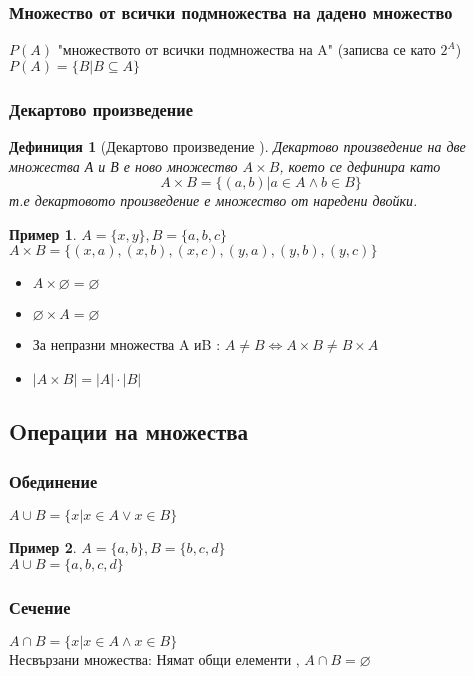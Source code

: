 \documentclass[fleqn, 12pt]{article}
\newtheorem{definition}{Дефиниция}[subsection]
\theoremstyle{definition}
\newtheorem{example}{Пример}[subsection]
\begin{document}
\subsubsection{Множество от всички подмножества на дадено множество}
$P(A)$ "множеството от всички подмножества на A" (записва се като $2^A$)\\
$P(A) = \{B | B\subseteq A \}$

\subsubsection{Декартово произведение}
\begin{definition}[Декартово произведение ]
Декартово произведение на две множества А и В е ново множество $A \times B$, което се дефинира като
$$A \times B = \{(a,b) | a\in A \land b \in B \}$$
т.е декартовото произведение е множество от наредени двойки. 
\end{definition}

\begin{example}
$A = \{x, y\}, B = \{a, b, c\}$\\
$A \times B = \{(x, a), (x, b), (x, c), (y, a), (y, b), (y, c)\}$
\end{example}
 
\begin{itemize}
	\item $A \times \varnothing = \varnothing$
	\item $\varnothing \times A = \varnothing$
	\item За непразни множества A иB : $A\neq B \Leftrightarrow A \times B \neq B \times A$
	\item $|A \times B| = |A|\cdot |B|$
\end{itemize}

\subsection {Oперации на множества} 
 
\subsubsection{Обединение}
$A \cup B = \{x | x\in A \lor x \in B\}$
\begin{example}
$A = \{a, b\}, B = \{b, c, d\}$\\
$A \cup B = \{a, b, c, d\}$
\end{example}

\subsubsection{Сечение}
$A \cap B = \{x | x\in A \land x \in B\}$\\
Несвързани множества: Нямат общи елементи , $A \cap B = \varnothing$
\end{document}

